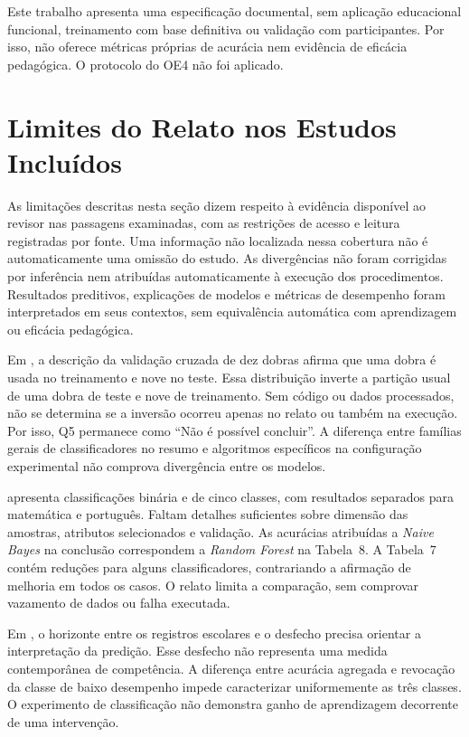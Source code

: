 Este trabalho apresenta uma especificação documental, sem aplicação educacional funcional, treinamento com base definitiva ou validação com participantes. Por isso, não oferece métricas próprias de acurácia nem evidência de eficácia pedagógica. O protocolo do OE4 não foi aplicado.

\section{Limites do Relato nos Estudos Incluídos}
\label{sec:limites-relato}

As limitações descritas nesta seção dizem respeito à evidência disponível ao revisor nas passagens examinadas, com as restrições de acesso e leitura registradas por fonte. Uma informação não localizada nessa cobertura não é automaticamente uma omissão do estudo. As divergências não foram corrigidas por inferência nem atribuídas automaticamente à execução dos procedimentos. Resultados preditivos, explicações de modelos e métricas de desempenho foram interpretados em seus contextos, sem equivalência automática com aprendizagem ou eficácia pedagógica.

Em , a descrição da validação cruzada de dez dobras afirma que uma dobra é usada no treinamento e nove no teste. Essa distribuição inverte a partição usual de uma dobra de teste e nove de treinamento. Sem código ou dados processados, não se determina se a inversão ocorreu apenas no relato ou também na execução. Por isso, Q5 permanece como ``Não é possível concluir''. A diferença entre famílias gerais de classificadores no resumo e algoritmos específicos na configuração experimental não comprova divergência entre os modelos.

 apresenta classificações binária e de cinco classes, com resultados separados para matemática e português. Faltam detalhes suficientes sobre dimensão das amostras, atributos selecionados e validação. As acurácias atribuídas a \textit{Naive Bayes} na conclusão correspondem a \textit{Random Forest} na Tabela~8. A Tabela~7 contém reduções para alguns classificadores, contrariando a afirmação de melhoria em todos os casos. O relato limita a comparação, sem comprovar vazamento de dados ou falha executada.

Em , o horizonte entre os registros escolares e o desfecho precisa orientar a interpretação da predição. Esse desfecho não representa uma medida contemporânea de competência. A diferença entre acurácia agregada e revocação da classe de baixo desempenho impede caracterizar uniformemente as três classes. O experimento de classificação não demonstra ganho de aprendizagem decorrente de uma intervenção.


